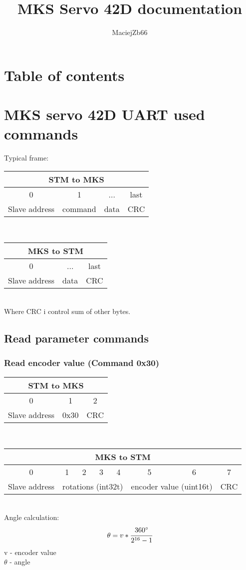 \documentclass[]{article}
\title{MKS Servo 42D documentation}
\author{MaciejZb66}
\date{}
\begin{document}
	\maketitle
	\pagestyle{fancy}
	\lhead{}
	\rhead{}	
	\lfoot{}
	\section{Table of contents}
	\hypertarget{tablelink}{}
	\tableofcontents
	\newpage
	\section{MKS servo 42D UART used commands}
	Typical frame: \\
	\begin{tabular}{|c|c|c|c|}
		\hline
		\multicolumn{4}{|c|}{STM to MKS} \\ \hline
		0 & 1 & ... & last \\ \hline
		Slave address & command & data & CRC \\ \hline
	\end{tabular}
	\\
	\begin{tabular}{|c|c|c|} 
		\hline
		\multicolumn{3}{|c|}{MKS to STM} \\ \hline
		0 & ... & last \\ \hline
		Slave address & data & CRC \\ \hline
	\end{tabular}
	\\
	Where CRC i control sum of other bytes.
	\subsection{Read parameter commands}
	\subsubsection*{Read encoder value (Command 0x30)}
	\begin{tabular}{|c|c|c|}
		\hline
		\multicolumn{3}{|c|}{STM to MKS} \\ \hline
		0 & 1 & 2 \\ \hline
		Slave address & 0x30 & CRC \\ \hline		
	\end{tabular} 
	\\
	\begin{tabular}{|c|c|c|c|c|c|c|c|}
		\hline
		\multicolumn{8}{|c|}{MKS to STM} \\ \hline
		0 & 1 & 2 & 3 & 4 & 5 & 6 & 7 \\ \hline
		Slave address & \multicolumn{4}{|c|}{rotations (int32t)} & \multicolumn{2}{|c|}{encoder value (uint16t)} & CRC \\ \hline
	\end{tabular}\\
	Angle calculation:
	$$\theta = v*\cfrac{360^\circ}{2^{16}-1}$$
	v - encoder value \\
	$\theta$ - angle \\
\end{document}
